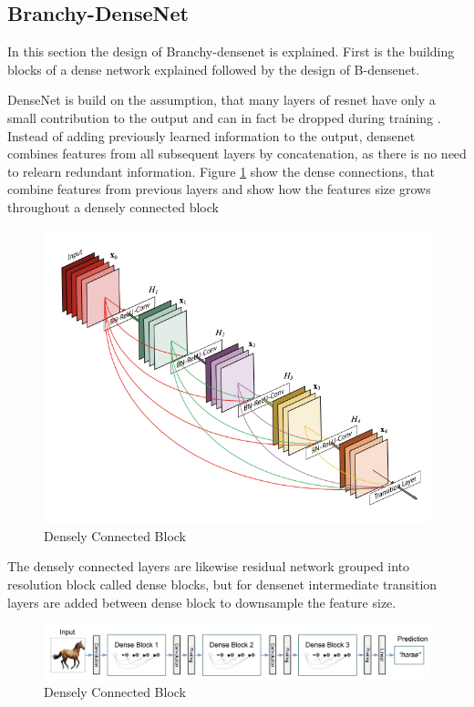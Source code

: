 \subsection{Branchy-DenseNet}

In this section the design of Branchy-\gls{densenet} is explained. First is the building blocks of a dense network explained followed by the design of B-\gls{densenet}.

DenseNet \cite{huang_densely_2016} is build on the assumption, that many layers of \gls{resnet} have only a small contribution to the output and can in fact be dropped during training \cite{huang_densely_2016}. Instead of adding previously learned information to the output, \gls{densenet} combines features from all subsequent layers by concatenation, as there is no need to relearn redundant information. Figure \ref{fig:denseblock} show the dense connections, that combine features from previous layers and show how the features size grows throughout a densely connected block

\begin{figure}
	\centering
	\includegraphics[width=.5\linewidth]{figures/models/denseblock}
	\caption[Densely Connected Block]{Densely Connected Block}
	\label{fig:denseblock}
\end{figure}

The densely connected layers are likewise residual network grouped into resolution block called dense blocks, but for \gls{densenet} intermediate transition layers are added between dense block to downsample the feature size. 

\begin{figure}
	\centering
	\includegraphics[width=\linewidth]{figures/models/densenet}
	\caption[Densely Connected Block]{Densely Connected Block}
	\label{fig:densenet}
\end{figure}

